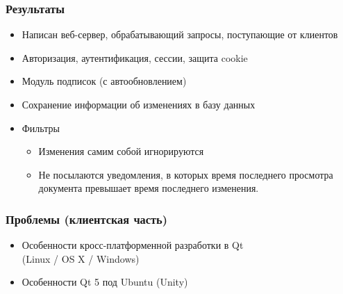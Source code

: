 \documentclass[10pt,pdf,hyperref={unicode}]{beamer}
\begin{document}
    \begin{frame}\frametitle{Результаты}
        \begin{itemize}%
            \item	Написан веб-сервер, обрабатывающий запросы, поступающие от клиентов            
            \item	Авторизация, аутентификация, сессии, защита cookie
	        \pause
            \item	Модуль подписок (с автообновлением)
            \item	Сохранение информации об изменениях в базу данных
	        \pause
            \item	Фильтры
            \begin{itemize}
                \item Изменения самим собой игнорируются
                \item Не посылаются уведомления, в которых время последнего просмотра документа превышает время последнего изменения.
            \end{itemize}

        \end{itemize}
    \end{frame}
    
    \begin{frame}\frametitle{Проблемы (клиентская часть)}
        \begin{itemize}%
            \item Особенности кросс-платформенной разработки в Qt \\
            (Linux / OS X / Windows)
            \item Особенности Qt 5 под Ubuntu (Unity)
        \end{itemize}
    \end{frame}
    
\end{document}
